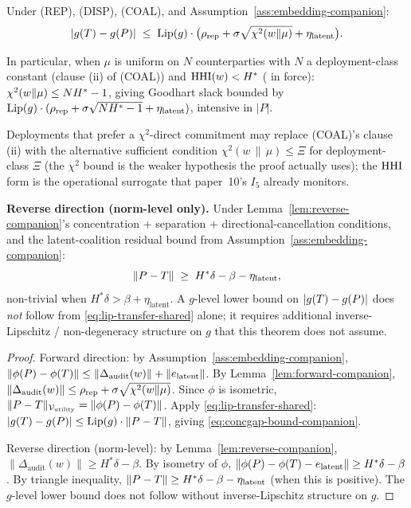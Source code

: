 \begin{theorem}
\label{thm:concgap-scoped}
Under (REP), (DISP), (COAL), and Assumption~\ref{ass:embedding-companion}:
\begin{equation}
\label{eq:concgap-bound-companion}
  |g(T) - g(P)| \;\leq\; \mathrm{Lip}(g) \cdot
  \big(\rho_\mathrm{rep} + \sigma \sqrt{\chi^2(w \|\mu)} +
  \eta_\mathrm{latent}\big).
\end{equation}

In particular, when $\mu$ is uniform on $N$ counterparties with
$N$ a deployment-class constant (clause (ii) of (COAL)) and
$\mathrm{HHI}(w) < H^*$ (\citep[invariant $I_5$]{lasser2026paper10} in
force): $\chi^2(w \|\mu) \leq N H^* - 1$, giving Goodhart slack
bounded by $\mathrm{Lip}(g) \cdot (\rho_\mathrm{rep} + \sigma \sqrt{N H^*
- 1} + \eta_\mathrm{latent})$, intensive in $|P|$.

Deployments that prefer a $\chi^2$-direct commitment may replace
(COAL)'s clause (ii) with the alternative sufficient condition
$\chi^2(w \,\|\, \mu) \leq \Xi$ for deployment-class $\Xi$ (the
$\chi^2$ bound is the weaker hypothesis the proof actually uses);
the $\mathrm{HHI}$ form is the operational surrogate that paper~10's
$I_5$ already monitors.

\textbf{Reverse direction (norm-level only).} Under
Lemma~\ref{lem:reverse-companion}'s concentration + separation
+ directional-cancellation conditions, and the latent-coalition
residual bound from Assumption~\ref{ass:embedding-companion}:
\begin{equation}
  \|P - T\| \;\geq\; H^* \delta - \beta -
  \eta_{\mathrm{latent}},
\end{equation}
non-trivial when $H^* \delta > \beta + \eta_{\mathrm{latent}}$.  A
$g$-level lower bound on $|g(T) - g(P)|$ does
\emph{not} follow from \eqref{eq:lip-transfer-shared} alone; it
requires additional inverse-Lipschitz / non-degeneracy structure
on $g$ that this theorem does not assume.
\end{theorem}

\begin{proof}
Forward direction: by Assumption~\ref{ass:embedding-companion},
$\|\phi(P) - \phi(T)\| \leq \|\Delta_\mathrm{audit}(w)\|
+ \|e_\mathrm{latent}\|$. By
Lemma~\ref{lem:forward-companion}, $\|\Delta_\mathrm{audit}(w)\|
\leq \rho_\mathrm{rep} + \sigma \sqrt{\chi^2(w \|\mu)}$. Since
$\phi$ is isometric, $\|P - T\|_{\mathcal{V}_\mathrm{utility}}
= \|\phi(P) - \phi(T)\|$. Apply
\eqref{eq:lip-transfer-shared}:
$|g(T) - g(P)| \leq \mathrm{Lip}(g) \cdot \|P -
T\|$, giving \eqref{eq:concgap-bound-companion}.

Reverse direction (norm-level): by
Lemma~\ref{lem:reverse-companion},
$\|\Delta_\mathrm{audit}(w)\| \geq H^* \delta - \beta$. By
isometry of $\phi$, $\|\phi(P) - \phi(T) -
e_\mathrm{latent}\| \geq H^* \delta - \beta$. By triangle
inequality, $\|P - T\| \geq H^* \delta - \beta -
\eta_\mathrm{latent}$ (when this is positive). The $g$-level
lower bound does not follow without inverse-Lipschitz structure
on $g$.
\end{proof}

